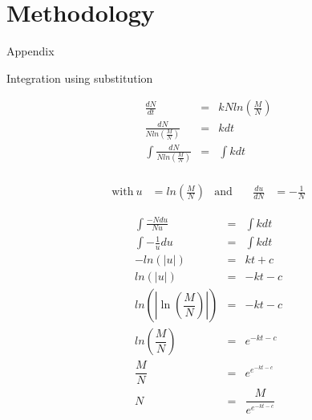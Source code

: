 \chapter{Methodology}






\clearpage



\clearpage

Appendix

Integration using substitution

\begin{eqnarray*}
\frac{dN}{dt}                                &=& kNln\left(\frac{M}{N} \right) \\
\frac{dN}{Nln\left(\frac{M}{N} \right)}      &=& kdt \\
\int \frac{dN}{Nln\left(\frac{M}{N} \right)} &=& \int kdt \\
\end{eqnarray*}

\begin{align*}
\text{with}\ u &= ln\left(\frac{M}{N} \right) & \text{and}\ && \frac{du}{dN} &= -\frac{1}{N}
\end{align*}

\begin{eqnarray*}
\int \frac{-Ndu}{Nu} &=& \int kdt \\
\int -\frac{1}{u}du &=& \int kdt \\
-ln\left(|{u}| \right) &=& kt + c \\
ln\left(|{u}| \right) &=& -kt - c \\
ln\left(\left|\ln\left(\dfrac{M}{N}\right)\right|\right) &=& -kt - c \\
ln\left(\dfrac{M}{N}\right) &=& e^{-kt - c} \\
\dfrac{M}{N}                &=& e^{e^{-kt - c}} \\
N                           &=& \dfrac{M}{e^{e^{-kt - c}}}
\end{eqnarray*}

